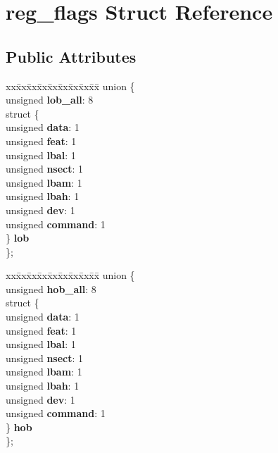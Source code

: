 \hypertarget{structreg__flags}{}\section{reg\+\_\+flags Struct Reference}
\label{structreg__flags}
\subsection*{Public Attributes}
\begin{DoxyCompactItemize}
\item 
\hypertarget{structreg__flags_abf8f8487488547d40950ef1b4cb6e534}{}\begin{tabbing}
xx\=xx\=xx\=xx\=xx\=xx\=xx\=xx\=xx\=\kill
union \{\\
\>unsigned {\bfseries lob\_all}: 8\\
\>struct \{\\
\>\>unsigned {\bfseries data}: 1\\
\>\>unsigned {\bfseries feat}: 1\\
\>\>unsigned {\bfseries lbal}: 1\\
\>\>unsigned {\bfseries nsect}: 1\\
\>\>unsigned {\bfseries lbam}: 1\\
\>\>unsigned {\bfseries lbah}: 1\\
\>\>unsigned {\bfseries dev}: 1\\
\>\>unsigned {\bfseries command}: 1\\
\>\} {\bfseries lob}\\
\}; \label{structreg__flags_abf8f8487488547d40950ef1b4cb6e534}
\\

\end{tabbing}\item 
\hypertarget{structreg__flags_a81dc5df548a34496b1c663c48416b8f3}{}\begin{tabbing}
xx\=xx\=xx\=xx\=xx\=xx\=xx\=xx\=xx\=\kill
union \{\\
\>unsigned {\bfseries hob\_all}: 8\\
\>struct \{\\
\>\>unsigned {\bfseries data}: 1\\
\>\>unsigned {\bfseries feat}: 1\\
\>\>unsigned {\bfseries lbal}: 1\\
\>\>unsigned {\bfseries nsect}: 1\\
\>\>unsigned {\bfseries lbam}: 1\\
\>\>unsigned {\bfseries lbah}: 1\\
\>\>unsigned {\bfseries dev}: 1\\
\>\>unsigned {\bfseries command}: 1\\
\>\} {\bfseries hob}\\
\}; \label{structreg__flags_a81dc5df548a34496b1c663c48416b8f3}
\\

\end{tabbing}\end{DoxyCompactItemize}


